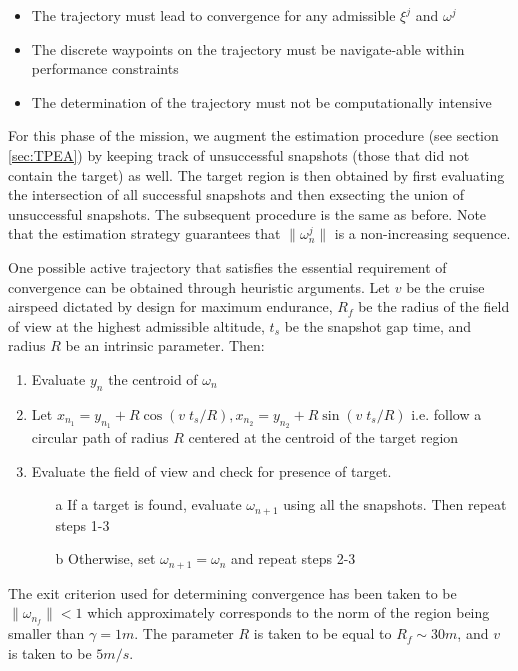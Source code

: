 \begin{itemize}
\item The trajectory must lead to convergence for any admissible $\xi^j$ and $\omega^j$
\item The discrete waypoints on the trajectory must be navigate-able within performance constraints
\item The determination of the trajectory must not be computationally intensive
\end{itemize}

For this phase of the mission, we augment the estimation procedure (see section \ref{sec:TPEA}) by keeping track of unsuccessful snapshots (those that did not contain the target) as well. The target region is then obtained by first evaluating the intersection of all successful snapshots and then exsecting the union of unsuccessful snapshots. The subsequent procedure is the same as before. Note that the estimation strategy guarantees that $\| \omega_n^j \|$ is a non-increasing sequence.

One possible active trajectory that satisfies the essential requirement of convergence can be obtained through heuristic arguments. Let $v$ be the cruise airspeed dictated by design for maximum endurance, $R_f$ be the radius of the field of view at the highest admissible altitude, $t_s$ be the snapshot gap time, and radius $R$ be an intrinsic parameter. Then:

\begin{enumerate}
\item Evaluate $y_n$ the centroid of $\omega_n$
\item Let $x_{n_1} = y_{n_1} + R \cos (v\;t_s/R), x_{n_2} = y_{n_2} + R \sin (v\;t_s/R)$ i.e. follow a circular path of radius $R$ centered at the centroid of the target region
\item Evaluate the field of view and check for presence of target. 
  \begin{enumerate}
  \item[a] If a target is found, evaluate $\omega_{n+1}$ using all the snapshots. Then repeat steps 1-3
  \item[b] Otherwise, set $\omega_{n+1} = \omega_{n}$  and repeat steps 2-3
  \end{enumerate}
\end{enumerate}

The exit criterion used for determining convergence has been taken to be $\| \omega_{n_f} \| < 1$ which approximately corresponds to the norm of the region being smaller than $\gamma = 1m$. The parameter $R$ is taken to be equal to $R_f \sim 30m$, and $v$ is taken to be $5 m/s$.

